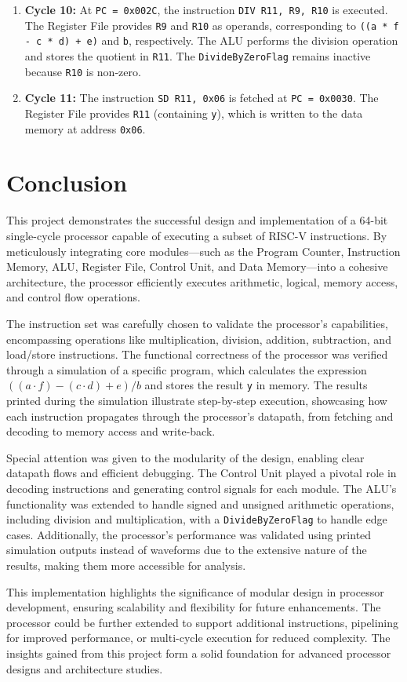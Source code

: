 \documentclass[12pt]{article}
\begin{document}
\begin{enumerate}
   \item \textbf{Cycle 10:} At \texttt{PC = 0x002C}, the instruction \texttt{DIV R11, R9, R10} is executed. The Register File provides \texttt{R9} and \texttt{R10} as operands, corresponding to \texttt{((a * f - c * d) + e)} and \texttt{b}, respectively. The ALU performs the division operation and stores the quotient in \texttt{R11}. The \texttt{DivideByZeroFlag} remains inactive because \texttt{R10} is non-zero.

    \item \textbf{Cycle 11:} The instruction \texttt{SD R11, 0x06} is fetched at \texttt{PC = 0x0030}. The Register File provides \texttt{R11} (containing \texttt{y}), which is written to the data memory at address \texttt{0x06}.
\end{enumerate}

\section*{Conclusion}

This project demonstrates the successful design and implementation of a 64-bit single-cycle processor capable of executing a subset of RISC-V instructions. By meticulously integrating core modules—such as the Program Counter, Instruction Memory, ALU, Register File, Control Unit, and Data Memory—into a cohesive architecture, the processor efficiently executes arithmetic, logical, memory access, and control flow operations. 

The instruction set was carefully chosen to validate the processor's capabilities, encompassing operations like multiplication, division, addition, subtraction, and load/store instructions. The functional correctness of the processor was verified through a simulation of a specific program, which calculates the expression \(((a \cdot f) - (c \cdot d) + e) / b\) and stores the result \texttt{y} in memory. The results printed during the simulation illustrate step-by-step execution, showcasing how each instruction propagates through the processor's datapath, from fetching and decoding to memory access and write-back.

Special attention was given to the modularity of the design, enabling clear datapath flows and efficient debugging. The Control Unit played a pivotal role in decoding instructions and generating control signals for each module. The ALU's functionality was extended to handle signed and unsigned arithmetic operations, including division and multiplication, with a \texttt{DivideByZeroFlag} to handle edge cases. Additionally, the processor's performance was validated using printed simulation outputs instead of waveforms due to the extensive nature of the results, making them more accessible for analysis.

This implementation highlights the significance of modular design in processor development, ensuring scalability and flexibility for future enhancements. The processor could be further extended to support additional instructions, pipelining for improved performance, or multi-cycle execution for reduced complexity. The insights gained from this project form a solid foundation for advanced processor designs and architecture studies.
\end{document}
